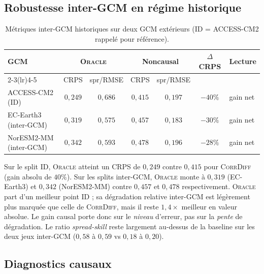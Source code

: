 \documentclass[14pt,a4paper,openany]{extreport}
\newcommand{\Oracle}{\textsc{Oracle}}
\newcommand{\CorrDiff}{\textsc{CorrDiff}}
\begin{document}
\subsection{Robustesse inter-GCM en régime historique}
\label{ssec:exp-res-ood}

\begin{table}[ht]
  \centering
  \small
  \caption[Métriques inter-GCM]{Métriques inter-GCM historiques sur deux GCM extérieurs (ID = ACCESS-CM2 rappelé pour référence).}
  \label{tab:exp-res-ood}
  \begin{tabularx}{\linewidth}{l c c c c c X}
    \toprule
    \textbf{GCM} & \multicolumn{2}{c}{\Oracle{}} & \multicolumn{2}{c}{\textbf{Noncausal}} & \multirow{2}{*}{$\Delta$ CRPS} & \multirow{2}{*}{\textbf{Lecture}} \\
    \cmidrule(lr){2-3}\cmidrule(lr){4-5}
     & CRPS & spr/RMSE & CRPS & spr/RMSE & & \\
    \midrule
    ACCESS-CM2 (ID) & $0{,}249$ & $0{,}686$ & $0{,}415$ & $0{,}197$ & $-40\%$ & gain net \\
    EC-Earth3 (inter-GCM) & $0{,}319$ & $0{,}575$ & $0{,}457$ & $0{,}183$ & $-30\%$ & gain net \\
    NorESM2-MM (inter-GCM) & $0{,}342$ & $0{,}593$ & $0{,}478$ & $0{,}196$ & $-28\%$ & gain net \\
    \bottomrule
  \end{tabularx}
\end{table}

Sur le split ID, \Oracle{} atteint un CRPS de $0{,}249$ contre $0{,}415$ pour \CorrDiff{} (gain absolu de $40\%$). Sur les splits inter-GCM, \Oracle{} monte à $0{,}319$ (EC-Earth3) et $0{,}342$ (NorESM2-MM) contre $0{,}457$ et $0{,}478$ respectivement. \Oracle{} part d'un meilleur point ID ; sa dégradation relative inter-GCM est légèrement plus marquée que celle de \CorrDiff{}, mais il reste $1{,}4\times$ meilleur en valeur absolue. Le gain causal porte donc sur le \emph{niveau} d'erreur, pas sur la \emph{pente} de dégradation. Le ratio \emph{spread-skill} reste largement au-dessus de la baseline sur les deux jeux inter-GCM ($0{,}58$ à $0{,}59$ vs $0{,}18$ à $0{,}20$).

\subsection{Diagnostics causaux}
\label{ssec:exp-res-causal}
\end{document}

